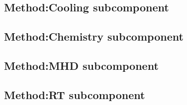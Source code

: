 \subsection{Method:Cooling subcomponent}

\subsection{Method:Chemistry subcomponent}

\subsection{Method:MHD subcomponent}

\subsection{Method:RT subcomponent}

